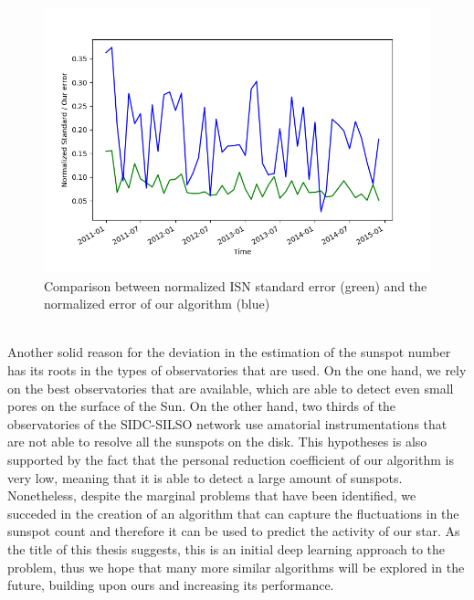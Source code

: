 \begin{figure}[b!]
  \centering
  \captionsetup{justification=centering}
  \includegraphics[width=\textwidth]{./pictures/error-norm}
  \caption{Comparison between normalized ISN standard error (green) and the normalized error of our algorithm (blue)}
  \label{fig:error-norm}
\end{figure}\\
Another solid reason for the deviation in the estimation of the sunspot number has its roots in the types of observatories that are used. On the one hand, we rely on the best observatories that are available, which are able to detect even small pores on the surface of the Sun. On the other hand, two thirds of the observatories of the SIDC-SILSO network use amatorial instrumentations that are not able to resolve all the sunspots on the disk. This hypotheses is also supported by the fact that the personal reduction coefficient of our algorithm is very low, meaning that it is able to detect a large amount of sunspots.\\
Nonetheless, despite the marginal problems that have been identified, we succeded in the creation of an algorithm that can capture the fluctuations in the sunspot count and therefore it can be used to predict the activity of our star. As the title of this thesis suggests, this is an initial deep learning approach to the problem, thus we hope that many more similar algorithms will be explored in the future, building upon ours and increasing its performance.
